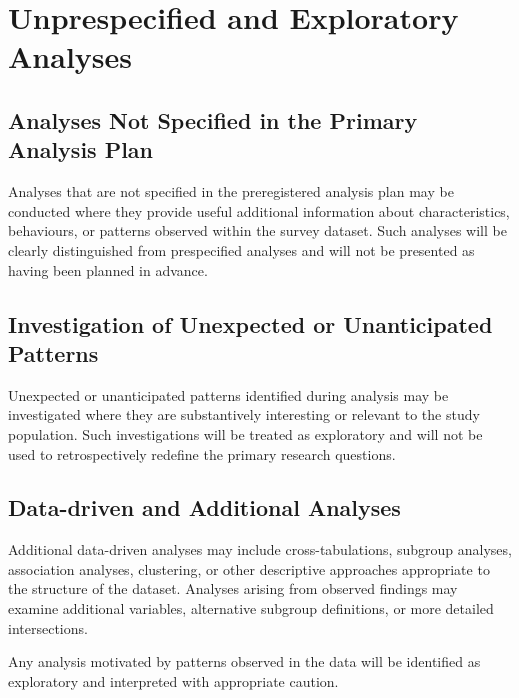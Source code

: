 \section{Unprespecified and Exploratory Analyses}

\subsection{Analyses Not Specified in the Primary Analysis Plan}

Analyses that are not specified in the preregistered analysis plan may be conducted where they provide useful additional information about characteristics, behaviours, or patterns observed within the survey dataset. Such analyses will be clearly distinguished from prespecified analyses and will not be presented as having been planned in advance.

\subsection{Investigation of Unexpected or Unanticipated Patterns}


Unexpected or unanticipated patterns identified during analysis may be investigated where they are substantively interesting or relevant to the study population. Such investigations will be treated as exploratory and will not be used to retrospectively redefine the primary research questions.

\subsection{Data-driven and Additional Analyses}

Additional data-driven analyses may include cross-tabulations, subgroup analyses, association analyses, clustering, or other descriptive approaches appropriate to the structure of the dataset. Analyses arising from observed findings may examine additional variables, alternative subgroup definitions, or more detailed intersections.

Any analysis motivated by patterns observed in the data will be identified as exploratory and interpreted with appropriate caution.


